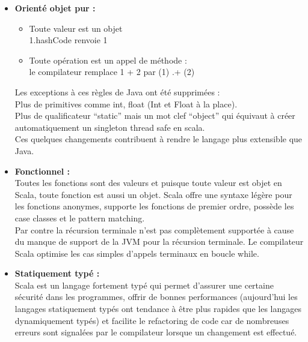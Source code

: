 \begin{itemize}
\item[\textbullet]\textbf{Orienté objet pur :}
  \begin{itemize}
  \item Toute valeur est un objet \\
    1.hashCode renvoie 1
  \item Toute opération est un appel de méthode :\\
    le compilateur remplace 1 + 2 par (1) .+ (2)\\
  \end{itemize}
  Les exceptions à ces règles de Java ont été supprimées :\\
  Plus de primitives comme int, float (Int et Float à la place).\\
  Plus de qualificateur ``static'' mais un mot clef ``object'' qui équivaut à créer
  automatiquement un singleton thread safe en scala. \\
  Ces quelques changements contribuent à rendre le langage plus extensible
  que Java.\\
\item[\textbullet]\textbf{Fonctionnel :}\\ 
  Toutes les fonctions sont des valeurs et puisque toute valeur est objet en
  Scala, toute fonction est aussi un objet. 
  Scala offre une syntaxe légère pour les fonctions anonymes, supporte les
  fonctions de premier ordre, possède les case classes et le pattern matching.\\
  Par contre la récursion terminale n'est pas complètement supportée à cause du
  manque de support de la JVM pour la récursion terminale. Le compilateur Scala
  optimise les cas simples d'appels terminaux en boucle while.\\
\item[\textbullet]\textbf{Statiquement typé :}\\
  Scala est un langage fortement typé qui permet d'assurer une certaine sécurité
  dans les programmes, offrir de bonnes performances (aujourd'hui les langages
  statiquement typés ont tendance à être plus rapides que les langages
  dynamiquement typés) et facilite le refactoring de code car de nombreuses
  erreurs sont signalées par le compilateur lorsque un changement est effectué.\\


\end{itemize}
